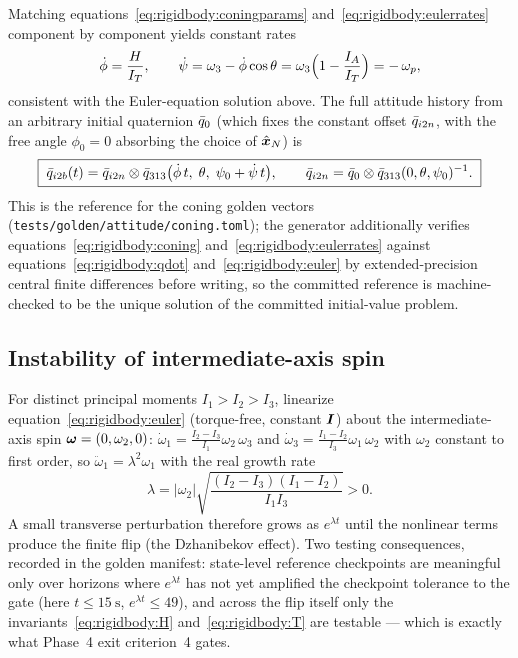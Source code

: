 Matching equations~\eqref{eq:rigidbody:coningparams}
and~\eqref{eq:rigidbody:eulerrates} component by component yields constant
rates
\begin{equation}
  \dot{\phi} = \frac{H}{I_T},
  \qquad
  \dot{\psi} = \omega_3 - \dot{\phi}\cos\theta
             = \omega_3 \Bigl(1 - \frac{I_A}{I_T}\Bigr)
             = -\,\omega_p ,
  \label{eq:rigidbody:coningrates}
\end{equation}
consistent with the Euler-equation solution above. The full attitude
history from an arbitrary initial quaternion $\bar{q}_0$ (which fixes the
constant offset $\bar{q}_{i2n}$, with the free angle $\phi_0 = 0$
absorbing the choice of $\hat{\bm{x}}_N$) is
\begin{equation}
  \boxed{\;
  \bar{q}_{i2b}(t)
    = \bar{q}_{i2n} \otimes
      \bar{q}_{313}\bigl(\dot{\phi}\,t,\; \theta,\;
        \psi_0 + \dot{\psi}\,t\bigr),
  \qquad
  \bar{q}_{i2n} = \bar{q}_0 \otimes
      \bar{q}_{313}(0, \theta, \psi_0)^{-1} .
  \;}
  \label{eq:rigidbody:coning}
\end{equation}
This is the reference for the coning golden vectors
(\texttt{tests/golden/attitude/coning.toml}); the generator additionally
verifies equations~\eqref{eq:rigidbody:coning}
and~\eqref{eq:rigidbody:eulerrates} against
equations~\eqref{eq:rigidbody:qdot} and~\eqref{eq:rigidbody:euler} by
extended-precision central finite differences before writing, so the
committed reference is machine-checked to be the unique solution of the
committed initial-value problem.

\subsection{Instability of intermediate-axis spin}

For distinct principal moments $I_1 > I_2 > I_3$, linearize
equation~\eqref{eq:rigidbody:euler} (torque-free, constant $\bm{I}$)
about the intermediate-axis spin $\bm{\omega} = (0, \omega_2, 0)$:
$\dot{\omega}_1 = \frac{I_2 - I_3}{I_1}\omega_2\,\omega_3$ and
$\dot{\omega}_3 = \frac{I_1 - I_2}{I_3}\omega_1\,\omega_2$ with $\omega_2$
constant to first order, so $\ddot{\omega}_1 = \lambda^2 \omega_1$ with
the real growth rate
\begin{equation}
  \lambda = |\omega_2| \sqrt{\frac{(I_2 - I_3)(I_1 - I_2)}{I_1 I_3}} > 0 .
  \label{eq:rigidbody:lambda}
\end{equation}
A small transverse perturbation therefore grows as $e^{\lambda t}$ until
the nonlinear terms produce the finite flip (the Dzhanibekov effect). Two
testing consequences, recorded in the golden manifest: state-level
reference checkpoints are meaningful only over horizons where
$e^{\lambda t}$ has not yet amplified the checkpoint tolerance to the gate
(here $t \le \qty{15}{\second}$, $e^{\lambda t} \le 49$), and across the
flip itself only the invariants~\eqref{eq:rigidbody:H}
and~\eqref{eq:rigidbody:T} are testable --- which is exactly what Phase~4
exit criterion~4 gates.

